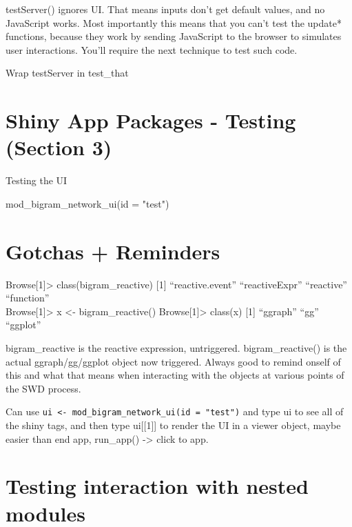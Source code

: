 \documentclass[
  letterpaper,
  DIV=11,
  numbers=noendperiod]{scrreprt}
\newenvironment{Shaded}{\begin{snugshade}}{\end{snugshade}}
\newcommand{\AttributeTok}[1]{\textcolor[rgb]{0.40,0.45,0.13}{#1}}
\newcommand{\FunctionTok}[1]{\textcolor[rgb]{0.28,0.35,0.67}{#1}}
\newcommand{\NormalTok}[1]{\textcolor[rgb]{0.00,0.23,0.31}{#1}}
\newcommand{\StringTok}[1]{\textcolor[rgb]{0.13,0.47,0.30}{#1}}
\begin{document}
testServer() ignores UI. That means inputs don't get default values, and
no JavaScript works. Most importantly this means that you can't test the
update* functions, because they work by sending JavaScript to the
browser to simulates user interactions. You'll require the next
technique to test such code.

Wrap testServer in test\_that

\section{Shiny App Packages - Testing (Section
3)}\label{shiny-app-packages---testing-section-3}

Testing the UI

\begin{Shaded}
\begin{Highlighting}[]
\FunctionTok{mod\_bigram\_network\_ui}\NormalTok{(}\AttributeTok{id =} \StringTok{"test"}\NormalTok{)}
\end{Highlighting}
\end{Shaded}

\section{Gotchas + Reminders}\label{gotchas-reminders}

Browse{[}1{]}\textgreater{} class(bigram\_reactive) {[}1{]}
``reactive.event'' ``reactiveExpr'' ``reactive'' ``function''\\
Browse{[}1{]}\textgreater{} x \textless- bigram\_reactive()
Browse{[}1{]}\textgreater{} class(x) {[}1{]} ``ggraph'' ``gg''
``ggplot''

bigram\_reactive is the reactive expression, untriggered.
bigram\_reactive() is the actual ggraph/gg/ggplot object now triggered.
Always good to remind onself of this and what that means when
interacting with the objects at various points of the SWD process.

Can use
\texttt{ui\ \textless{}-\ mod\_bigram\_network\_ui(id\ =\ "test")} and
type ui to see all of the shiny tags, and then type ui{[}{[}1{]}{]} to
render the UI in a viewer object, maybe easier than end app, run\_app()
-\textgreater{} click to app.

\section{Testing interaction with nested
modules}\label{testing-interaction-with-nested-modules}
\end{document}
